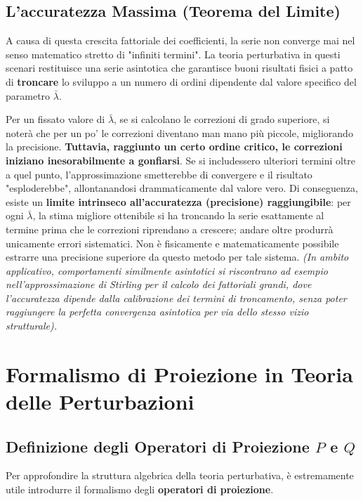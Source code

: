 \subsection{L'accuratezza Massima (Teorema del Limite)}
A causa di questa crescita fattoriale dei coefficienti, la serie non converge mai nel senso matematico stretto di "infiniti termini". La teoria perturbativa in questi scenari restituisce una serie asintotica che garantisce buoni risultati fisici a patto di \textbf{troncare} lo sviluppo a un numero di ordini dipendente dal valore specifico del parametro $\bar{\lambda}$.

Per un fissato valore di $\bar{\lambda}$, se si calcolano le correzioni di grado superiore, si noterà che per un po' le correzioni diventano man mano più piccole, migliorando la precisione. \textbf{Tuttavia, raggiunto un certo ordine critico, le correzioni iniziano inesorabilmente a gonfiarsi}. Se si includessero ulteriori termini oltre a quel punto, l'approssimazione smetterebbe di convergere e il risultato "esploderebbe", allontanandosi drammaticamente dal valore vero.
Di conseguenza, esiste un \textbf{limite intrinseco all'accuratezza (precisione) raggiungibile}: per ogni $\bar{\lambda}$, la stima migliore ottenibile si ha troncando la serie esattamente al termine prima che le correzioni riprendano a crescere; andare oltre produrrà unicamente errori sistematici. Non è fisicamente e matematicamente possibile estrarre una precisione superiore da questo metodo per tale sistema.
\textit{(In ambito applicativo, comportamenti similmente asintotici si riscontrano ad esempio nell'approssimazione di Stirling per il calcolo dei fattoriali grandi, dove l'accuratezza dipende dalla calibrazione dei termini di troncamento, senza poter raggiungere la perfetta convergenza asintotica per via dello stesso vizio strutturale).}

\section{Formalismo di Proiezione in Teoria delle Perturbazioni}

\subsection{Definizione degli Operatori di Proiezione $P$ e $Q$}
Per approfondire la struttura algebrica della teoria perturbativa, è estremamente utile introdurre il formalismo degli \textbf{operatori di proiezione}.


